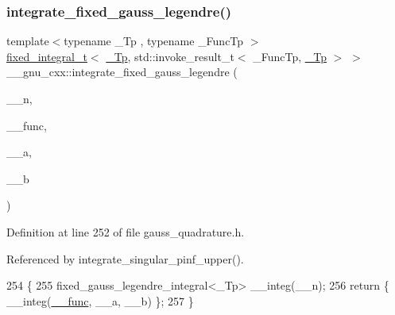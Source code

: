 \subsubsection{\texorpdfstring{integrate\+\_\+fixed\+\_\+gauss\+\_\+legendre()}{integrate\_fixed\_gauss\_legendre()}}
{\footnotesize\ttfamily template$<$typename \+\_\+\+Tp , typename \+\_\+\+Func\+Tp $>$ \\
\hyperlink{struct____gnu__cxx_1_1fixed__integral__t}{fixed\+\_\+integral\+\_\+t}$<$ \hyperlink{namespace____gnu__cxx_a3b19a9c800ca194374ef9172290f7d79}{\+\_\+\+Tp}, std\+::invoke\+\_\+result\+\_\+t$<$ \+\_\+\+Func\+Tp, \hyperlink{namespace____gnu__cxx_a3b19a9c800ca194374ef9172290f7d79}{\+\_\+\+Tp} $>$ $>$ \+\_\+\+\_\+gnu\+\_\+cxx\+::integrate\+\_\+fixed\+\_\+gauss\+\_\+legendre (\begin{DoxyParamCaption}\item[{int}]{\+\_\+\+\_\+n,  }\item[{\+\_\+\+Func\+Tp}]{\+\_\+\+\_\+func,  }\item[{\hyperlink{namespace____gnu__cxx_a3b19a9c800ca194374ef9172290f7d79}{\+\_\+\+Tp}}]{\+\_\+\+\_\+a,  }\item[{\hyperlink{namespace____gnu__cxx_a3b19a9c800ca194374ef9172290f7d79}{\+\_\+\+Tp}}]{\+\_\+\+\_\+b }\end{DoxyParamCaption})}



Definition at line 252 of file gauss\+\_\+quadrature.\+h.



Referenced by integrate\+\_\+singular\+\_\+pinf\+\_\+upper().


\begin{DoxyCode}
254     \{
255       fixed\_gauss\_legendre\_integral<\_Tp> \_\_integ(\_\_n);
256       \textcolor{keywordflow}{return} \{ \_\_integ(\hyperlink{namespace____gnu__cxx_af2b2f0c7a2ae72b922b1afefae5a65b2}{\_\_func}, \_\_a, \_\_b) \};
257     \}
\end{DoxyCode}
\mbox{\label{namespace____gnu__cxx_ae7ec81551d6057e093b7b2991ad6f3fa}} 
